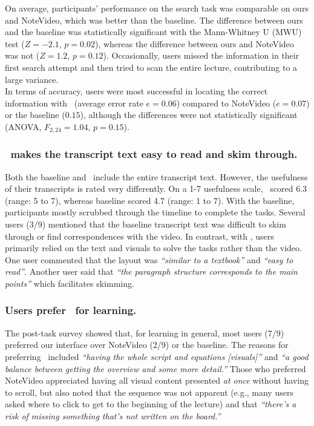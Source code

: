 On average, participants' performance on the search task was comparable on
ours and NoteVideo, which was better than the baseline. The difference between
ours and the baseline was statistically significant with the Mann-Whitney
U (MWU) test ($Z=-2.1$, $p=0.02$), whereas the difference between ours and
NoteVideo was not ($Z=1.2$, $p=0.12$). Occasionally, users missed the information in their first search attempt and  then tried to scan the entire lecture, contributing to a large variance.\\

In terms of accuracy, users were most successful in locating the correct information with \systemname\ (average error rate $e=0.06$) compared to NoteVideo ($e=0.07$) or the baseline ($0.15$), although the differences were not statistically significant (ANOVA, $F_{2,24}=1.04$, $p=0.15$).

\subsubsection{\systemname\ makes the transcript text easy to read and skim through.}
Both the baseline and \systemname\ include the entire transcript text. However,
the usefulness of their transcripts is rated very differently. On a 1-7 usefulness
scale, \systemname\ scored 6.3 (range: 5 to 7), whereas baseline scored 4.7
(range: 1 to 7). With the baseline, participants mostly scrubbed
through the timeline to complete the tasks. Several users (3/9) mentioned
that the baseline transcript text was difficult to skim through or find correspondences
with the video. In contrast, with \systemname , users primarily relied on
the text and visuals to solve the tasks rather than the video. One user
commented that the layout was \textit{``similar to a textbook''} and \textit{``easy
to read''}. Another user said that \textit{``the paragraph structure corresponds
to the main points''} which facilitates skimming.

\subsubsection{Users prefer \systemname\ for learning.}
The post-task survey showed that, for learning in general, most users (7/9) preferred our interface over NoteVideo (2/9) or the baseline. 
The reasons for preferring \systemname\ included \textit{``having the whole script and equations [visuals]''} and \textit{``a good balance between getting the overview and some more detail.''} Those who preferred NoteVideo appreciated having all visual content presented \textit{at once} without having to scroll, but also noted that the sequence was not apparent (e.g., many users asked where to click to get to the beginning of the lecture) and that \textit{``there's a risk of missing something that's not written on the board.''}\\
